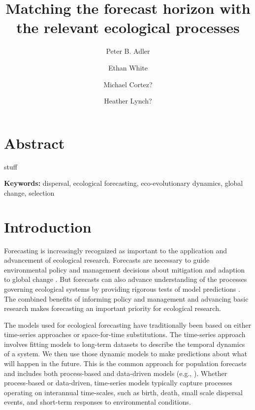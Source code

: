 \documentclass[11pt]{article}
\title{\textbf{ Matching the forecast horizon with the relevant ecological processes }}
\author[1]{Peter B. Adler}  %
\author[2]{Ethan White}
\author[1]{Michael Cortez?}
\author[3]{Heather Lynch?}
\affil[1]{Department of Wildland Resources and the Ecology Center, Utah State University, Logan, Utah}
\affil[2]{some shitty Florida joint}
\begin{document}
\maketitle

\linenumbers

\section*{Abstract}

stuff

\textbf{\large{Keywords:}} dispersal, ecological forecasting, eco-evolutionary dynamics, global change, selection

\section*{Introduction}

Forecasting is increasingly recognized as important to the application and advancement of ecological research.
Forecasts are necessary to guide environmental policy and management
decisions about mitigation and adaption to global change \citep{clark_ecological_2001,mouquet_review:_2015,dietze_iterative_2018}.
But forecasts can also advance understanding of the processes governing ecological systems by providing rigorous tests of 
model predictions \citep{houlahan_priority_2017,dietze_prediction_2017,dietze_iterative_2018}.
The combined benefits of informing policy and management and advancing basic research 
makes forecasting an important priority for ecological research.

The models used for ecological forecasting have traditionally been based on either time-series approaches or space-for-time substitutions.
The time-series approach involves fitting models to long-term datasets to describe the temporal dynamics of a system.  We then use those
dynamic models to make predictions about what will happen in the future. This is the common approach for population forecasts and includes 
both process-based and data-driven models (e.g., \citep{ward_complexity_2014}). Whether process-based or
data-driven, time-series models typically capture processes operating on interannual time-scales, such as birth, death, 
small scale dispersal events, and short-term responses to environmental conditions.
\end{document}

